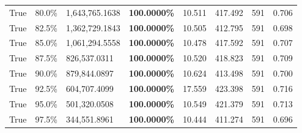 \begin{table}[H]
\begin{tabular}{lllrllll}
\cline{1-8}
True & 80.0\% & 1,643,765.1638 & \bfseries \color{red} 100.0000\% & 10.511 & 417.492 & 591 & 0.706 \\
\cline{1-8}
True & 82.5\% & 1,362,729.1843 & \bfseries \color{red} 100.0000\% & 10.505 & 412.795 & 591 & 0.698 \\
\cline{1-8}
True & 85.0\% & 1,061,294.5558 & \bfseries \color{red} 100.0000\% & 10.478 & 417.592 & 591 & 0.707 \\
\cline{1-8}
True & 87.5\% & 826,537.0311 & \bfseries \color{red} 100.0000\% & 10.520 & 418.823 & 591 & 0.709 \\
\cline{1-8}
True & 90.0\% & 879,844.0897 & \bfseries \color{red} 100.0000\% & 10.624 & 413.498 & 591 & 0.700 \\
\cline{1-8}
True & 92.5\% & 604,707.4099 & \bfseries \color{red} 100.0000\% & 17.559 & 423.398 & 591 & 0.716 \\
\cline{1-8}
True & 95.0\% & 501,320.0508 & \bfseries \color{red} 100.0000\% & 10.549 & 421.379 & 591 & 0.713 \\
\cline{1-8}
True & 97.5\% & 344,551.8961 & \bfseries \color{red} 100.0000\% & 10.444 & 411.274 & 591 & 0.696 \\
\cline{1-8}
\bottomrule
\end{tabular}
\end{table}
